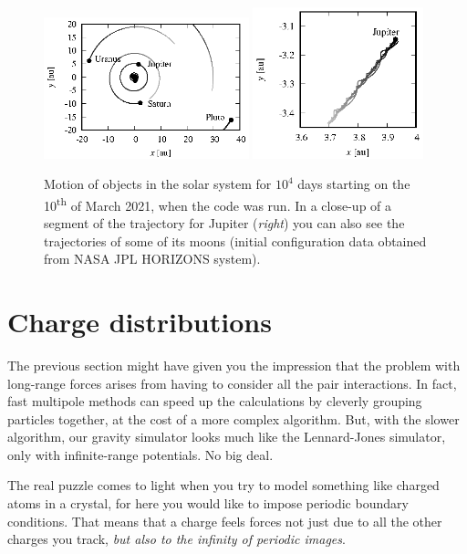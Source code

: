 \begin{figure}
  \begin{center}
  \includegraphics[width = 0.53\textwidth]{figures/gravity.eps}
  \includegraphics[width = 0.44\textwidth]{figures/Jupiter.eps}
  \end{center}
  \caption{\label{gravity}Motion of objects in the solar system for $10^4$ days 
           starting on the 10\textsuperscript{th} of March 2021, when the code 
           was run. In a close-up of a segment of the trajectory for Jupiter 
           (\textit{right}) you can also see the trajectories of some of its 
           moons (initial configuration data obtained from NASA JPL HORIZONS 
           system).}
\end{figure}

\section{Charge distributions}

The previous section might have given you the impression that the problem with 
long-range forces arises from having to consider all the pair interactions. In 
fact, fast multipole methods can speed up the calculations by cleverly grouping 
particles together, at the cost of a more complex algorithm. But, with the 
slower algorithm, our gravity simulator looks much like the Lennard-Jones 
simulator, only with infinite-range potentials. No big deal.

The real puzzle comes to light when you try to model something like charged 
atoms in a crystal, for here you would like to impose periodic boundary 
conditions. That means that a charge feels forces not just due to all the other 
charges you track, \textit{but also to the infinity of periodic images}.

